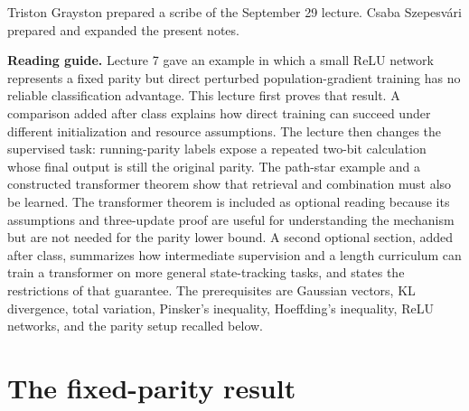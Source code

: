 \documentclass[11pt,twoside]{article}
\theoremstyle{definition}
\theoremstyle{remark}
\begin{document}
\begin{center}
\end{center}

\noindent Triston Grayston prepared a scribe of the September 29 lecture.
Csaba Szepesv\'ari prepared and expanded the present notes.

\medskip
\noindent\textbf{Reading guide.}
Lecture 7 gave an example in which a small ReLU network represents a fixed
parity but direct perturbed population-gradient training has no reliable
classification advantage. This lecture first proves that result. A comparison
added after class explains how direct training can succeed under different
initialization and resource assumptions. The lecture then changes the
supervised task: running-parity labels expose a repeated two-bit
calculation whose final output is still the original parity. The path-star
example and a constructed transformer theorem show that retrieval and
combination must also be learned. The transformer theorem is included as
optional reading because its assumptions and three-update proof are useful for
understanding the mechanism but are not needed for the parity lower bound.
A second optional section, added after class, summarizes how intermediate
supervision and a length curriculum can train a transformer on more general
state-tracking tasks, and states the restrictions of that guarantee.
The prerequisites are Gaussian vectors, KL divergence, total variation,
Pinsker's inequality, Hoeffding's inequality, ReLU networks, and the parity
setup recalled below.

\section{The fixed-parity result}
\label{sec:recap}
\end{document}

